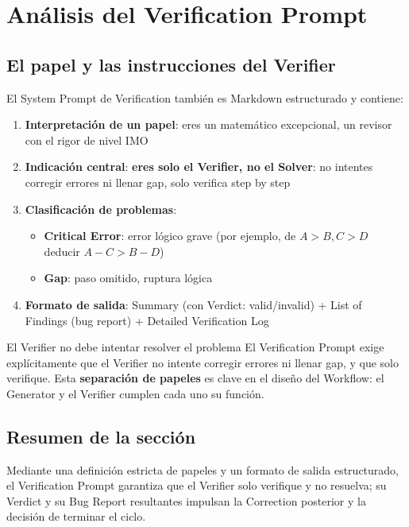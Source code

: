 \section{Análisis del Verification Prompt}

\subsection{El papel y las instrucciones del Verifier}

El System Prompt de Verification también es Markdown estructurado y contiene:

\begin{enumerate}
    \item \textbf{Interpretación de un papel}: eres un matemático excepcional, un revisor con el rigor de nivel IMO
    \item \textbf{Indicación central}: \textbf{eres solo el Verifier, no el Solver}: no intentes corregir errores ni llenar gap, solo verifica step by step
    \item \textbf{Clasificación de problemas}:
    \begin{itemize}
        \item \textbf{Critical Error}: error lógico grave (por ejemplo, de $A > B, C > D$ deducir $A-C > B-D$)
        \item \textbf{Gap}: paso omitido, ruptura lógica
    \end{itemize}
    \item \textbf{Formato de salida}: Summary (con Verdict: valid/invalid) + List of Findings (bug report) + Detailed Verification Log
\end{enumerate}

\begin{warningbox}{El Verifier no debe intentar resolver el problema}
El Verification Prompt exige explícitamente que el Verifier no intente corregir errores ni llenar gap, y que solo verifique. Esta \textbf{separación de papeles} es clave en el diseño del Workflow: el Generator y el Verifier cumplen cada uno su función.
\end{warningbox}

\subsection{Resumen de la sección}

Mediante una definición estricta de papeles y un formato de salida estructurado, el Verification Prompt garantiza que el Verifier solo verifique y no resuelva; su Verdict y su Bug Report resultantes impulsan la Correction posterior y la decisión de terminar el ciclo.

